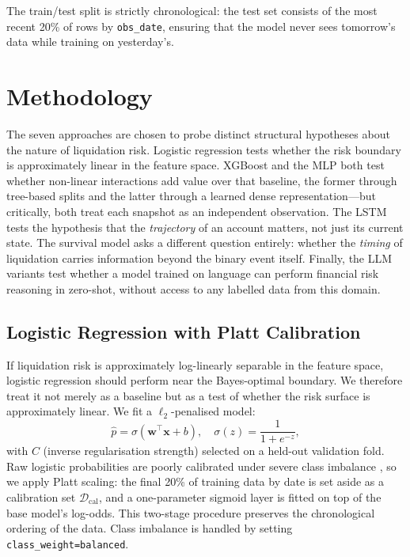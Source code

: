 \documentclass[12pt,a4paper]{article}
\newcommand{\bm}[1]{\boldsymbol{#1}}
\begin{document}
The train/test split is strictly chronological: the test set consists of the
most recent 20\% of rows by \texttt{obs\_date}, ensuring that the model never
sees tomorrow's data while training on yesterday's.


\section{Methodology}
\label{sec:methodology}

The seven approaches are chosen to probe distinct structural hypotheses about
the nature of liquidation risk.  Logistic regression tests whether the risk
boundary is approximately linear in the feature space.  XGBoost and the MLP
both test whether non-linear interactions add value over that baseline, the
former through tree-based splits and the latter through a learned dense
representation---but critically, both treat each snapshot as an independent
observation.  The LSTM tests the hypothesis that the \emph{trajectory} of
an account matters, not just its current state.  The survival model asks a
different question entirely: whether the \emph{timing} of liquidation carries
information beyond the binary event itself.  Finally, the LLM variants test
whether a model trained on language can perform financial risk reasoning in
zero-shot, without access to any labelled data from this domain.

\subsection{Logistic Regression with Platt Calibration}

If liquidation risk is approximately log-linearly separable in the feature
space, logistic regression should perform near the Bayes-optimal boundary.
We therefore treat it not merely as a baseline but as a test of whether the
risk surface is approximately linear.  We fit a $\ell_2$-penalised model:
\[
    \hat{p} = \sigma\!\left(\bm{w}^\top \bm{x} + b\right),
    \quad
    \sigma(z) = \frac{1}{1+e^{-z}},
\]
with $C$ (inverse regularisation strength) selected on a held-out validation
fold.  Raw logistic probabilities are poorly calibrated under severe class
imbalance \citep{platt1999probabilistic}, so we apply Platt scaling: the
final 20\% of training data by date is set aside as a calibration set
$\mathcal{D}_\text{cal}$, and a one-parameter sigmoid layer is fitted on top
of the base model's log-odds.  This two-stage procedure preserves the
chronological ordering of the data.  Class imbalance is handled by setting
\texttt{class\_weight=balanced}.
\end{document}
